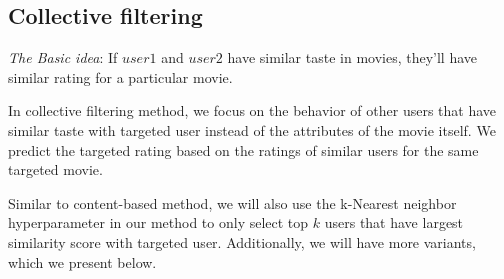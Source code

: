 \documentclass{article}
\begin{document}
\subsection{Collective filtering}

\textit{The Basic idea}: If $user 1$ and $user 2$ have similar taste in movies, they’ll have similar rating for a particular movie. 

In collective filtering method, we focus on the behavior of other users that have similar taste with targeted user instead of the attributes of the movie itself.  We predict the targeted rating based on the ratings of similar users for the same targeted movie.  

Similar to content-based method, we will also use the k-Nearest neighbor hyperparameter in our method to only select top $k$ users that have largest similarity score with targeted user. Additionally, we will have more variants, which we present below. 
\end{document}

